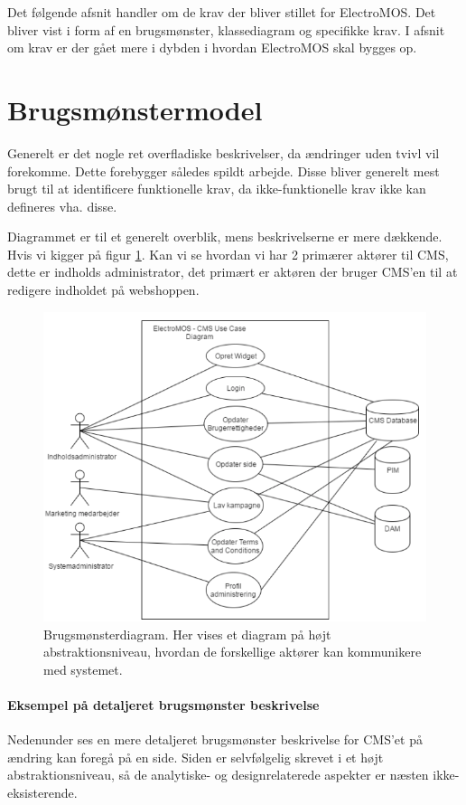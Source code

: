 
Det følgende afsnit handler om de krav der bliver stillet for ElectroMOS. Det bliver vist i form af en brugsmønster, klassediagram og specifikke krav. I afsnit om krav er der gået mere i dybden i hvordan ElectroMOS skal bygges op. 

\section{Brugsmønstermodel}
Generelt er det nogle ret overfladiske beskrivelser, da ændringer uden tvivl vil forekomme. Dette forebygger således spildt arbejde. Disse bliver generelt mest brugt til at identificere funktionelle krav, da ikke-funktionelle krav ikke kan defineres vha. disse.

Diagrammet er til et generelt overblik, mens beskrivelserne er mere dækkende.
Hvis vi kigger på figur \ref{fig:Usecasediagram-CMS}. Kan vi se hvordan vi har 2 primærer aktører til CMS, dette er indholds administrator, det primært er aktøren der bruger CMS’en til at redigere indholdet på webshoppen.

\begin{figure}
  \includegraphics[width=\linewidth]{inceptionsdokumentet/figurer/Usecasediagram-CMS.png}
  \caption{Brugsmønsterdiagram. Her vises et diagram på højt abstraktionsniveau, hvordan de forskellige aktører kan kommunikere med systemet.}
  \label{fig:Usecasediagram-CMS}
\end{figure}

\paragraph{Eksempel på detaljeret brugsmønster beskrivelse}
Nedenunder ses en mere detaljeret brugsmønster beskrivelse for CMS’et på ændring kan foregå på en side. Siden er selvfølgelig skrevet i et højt abstraktionsniveau, så de analytiske- og designrelaterede aspekter er næsten ikke-eksisterende.


